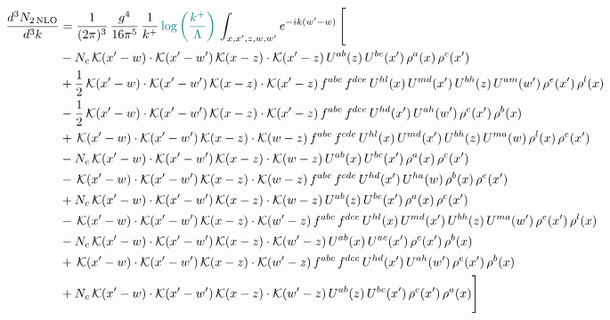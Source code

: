 \documentclass[9pt]{article}
\numberwithin{equation}{section}
\begin{document}
\begin{align}
\frac{d^{3}N_{2\,\mathrm{NLO}}}{d^{3}k} & = \frac{1}{(2\pi)^{3}}\,\frac{g^{4}}{16\pi^{5}}\,\frac{1}{k^{+}}\,{\color{teal}\log{\left(\frac{k^{+}}{\Lambda}\right)}}\,\int_{x,x',z,w,w'}e^{-ik(w'-w)}\,\Bigg[\notag\\ & -N_{c}\,\mathcal{K}(x'-w)\cdot\mathcal{K}(x'-w')\,\mathcal{K}(x-z)\cdot\mathcal{K}(x'-z)\,U^{ab}(z)\,U^{bc}(x')\,\rho^{a}(x)\,\rho^{c}(x')\notag\\
& +\frac{1}{2}\,\mathcal{K}(x'-w)\cdot\mathcal{K}(x'-w')\,\mathcal{K}(x-z)\cdot\mathcal{K}(x'-z)\,f^{abc}\,f^{dce}\,U^{hl}(x)\,U^{md}(x')\,U^{bh}(z)\,U^{am}(w')\,\rho^{e}(x')\,\rho^{l}(x)\notag\\
& -\frac{1}{2}\,\mathcal{K}(x'-w)\cdot\mathcal{K}(x'-w')\,\mathcal{K}(x-z)\cdot\mathcal{K}(x'-z)\,f^{abc}\,f^{dce}\,U^{hd}(x')\,U^{ah}(w')\,\rho^{e}(x')\,\rho^{b}(x)\notag\\
& +\,\mathcal{K}(x'-w)\cdot\mathcal{K}(x'-w')\,\mathcal{K}(x-z)\cdot\mathcal{K}(w-z)\,f^{abc}\,f^{cde}\,U^{hl}(x)\,U^{md}(x')\,U^{bh}(z)\,U^{ma}(w)\,\rho^{l}(x)\,\rho^{e}(x')\notag\\
& -N_{c}\,\mathcal{K}(x'-w)\cdot\mathcal{K}(x'-w')\,\mathcal{K}(x-z)\cdot\mathcal{K}(w-z)\,U^{ab}(x)\,U^{bc}(x')\,\rho^{a}(x)\,\rho^{c}(x')\notag\\
& -\,\mathcal{K}(x'-w)\cdot\mathcal{K}(x'-w')\,\mathcal{K}(x-z)\cdot\mathcal{K}(w-z)\,f^{abc}\,f^{cde}\,U^{hd}(x')\,U^{ha}(w)\,\rho^{b}(x)\,\rho^{e}(x')\notag\\
& +N_{c}\,\mathcal{K}(x'-w)\cdot\mathcal{K}(x'-w')\,\mathcal{K}(x-z)\cdot\mathcal{K}(w-z)\,U^{ab}(z)\,U^{bc}(x')\,\rho^{a}(x)\,\rho^{c}(x')\notag\\
& -\,\mathcal{K}(x'-w)\cdot\mathcal{K}(x'-w')\,\mathcal{K}(x-z)\cdot\mathcal{K}(w'-z)\,f^{abc}\,f^{dce}\,U^{hl}(x)\,U^{md}(x')\,U^{bh}(z)\,U^{ma}(w')\,\rho^{e}(x')\,\rho^{l}(x)\notag\\
& -N_{c}\,\mathcal{K}(x'-w)\cdot\mathcal{K}(x'-w')\,\mathcal{K}(x-z)\cdot\mathcal{K}(w'-z)\,U^{ab}(x)\,U^{ac}(x')\,\rho^{c}(x')\,\rho^{b}(x)\notag\\
& +\,\mathcal{K}(x'-w)\cdot\mathcal{K}(x'-w')\,\mathcal{K}(x-z)\cdot\mathcal{K}(w'-z)\,f^{abc}\,f^{dce}\,U^{hd}(x')\,U^{ah}(w')\,\rho^{e}(x')\,\rho^{b}(x)\notag\\
& +N_{c}\,\mathcal{K}(x'-w)\cdot\mathcal{K}(x'-w')\,\mathcal{K}(x-z)\cdot\mathcal{K}(w'-z)\,U^{ab}(z)\,U^{bc}(x')\,\rho^{c}(x')\,\rho^{a}(x)\Bigg]
\end{align}
\end{document}
